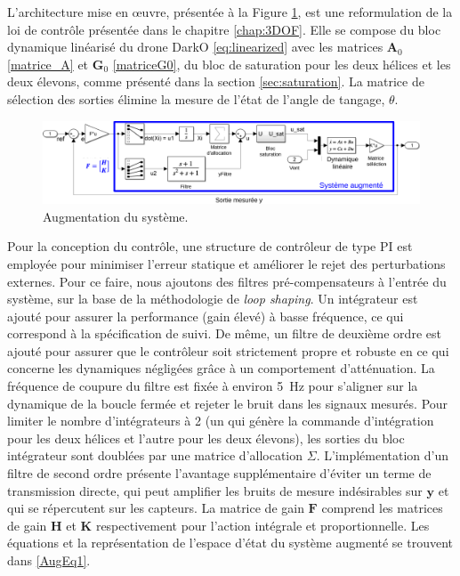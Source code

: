  L'architecture mise en œuvre, présentée à la Figure \ref{Plant Augmentation}, est une reformulation de la loi de contrôle présentée dans le chapitre \ref{chap:3DOF}. Elle se compose du bloc dynamique linéarisé du drone DarkO \eqref{eq:linearized} avec les matrices $\boldsymbol{A}_{0}$ \eqref{matrice_A} et $\boldsymbol{G}_{0}$ \eqref{matriceG0}, du bloc de saturation pour les deux hélices et les deux élevons, comme présenté dans la section \ref{sec:saturation}. La matrice de sélection des sorties élimine la mesure de l'état de l'angle de tangage, $\theta$.

\begin{figure}[hbt]
    \centering
    \includegraphics[width=0.9\columnwidth]{figures/AugWindFinal.png}
    \caption{Augmentation du système.}
    \label{Plant Augmentation}
\end{figure}


Pour la conception du contrôle, une structure de contrôleur de type PI est employée pour minimiser l'erreur statique et améliorer le rejet des perturbations externes. Pour ce faire, nous ajoutons des filtres pré-compensateurs à l'entrée du système, sur la base de la méthodologie de \textit{loop shaping}. Un intégrateur est ajouté pour assurer la performance (gain élevé) à basse fréquence, ce qui correspond à la spécification de suivi. De même, un filtre de deuxième ordre est ajouté pour assurer que le contrôleur soit strictement propre et robuste en ce qui concerne les dynamiques négligées grâce à un comportement d'atténuation. La fréquence de coupure du filtre est fixée à environ \SI{5}{\hertz} pour s'aligner sur la dynamique de la boucle fermée et rejeter le bruit dans les signaux mesurés. Pour limiter le nombre d'intégrateurs à 2 (un qui génère la commande d'intégration pour les deux hélices et l'autre pour les deux élevons), les sorties du bloc intégrateur sont doublées par une matrice d'allocation $\Sigma$. L'implémentation d'un filtre de second ordre présente l'avantage supplémentaire d'éviter un terme de transmission directe, qui peut amplifier les bruits de mesure indésirables sur $\boldsymbol{y}$ et qui se répercutent sur les capteurs. La matrice de gain $\boldsymbol{F}$ comprend les matrices de gain $\boldsymbol{H}$ et $\boldsymbol{K}$ respectivement pour l'action intégrale et proportionnelle. Les équations et la représentation de l'espace d'état du système augmenté se trouvent dans \eqref{AugEq1}.

